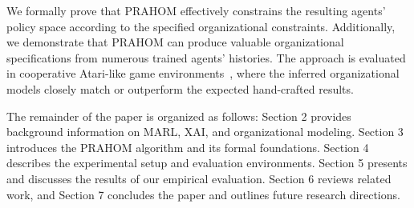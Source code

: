 \documentclass{ecai}
\newtheorem{theorem}{Theorem}
\newcounter{proof}
\renewcommand{\theproof}{\arabic{proof}}
\renewenvironment{proof}[1][]{
    \refstepcounter{proof}
    \noindent \raggedright \textit{\textbf{Proof. \theproof}}

    \setlength{\leftskip}{1em}

}
{

\
\setlength{\leftskip}{0pt}
}
\begin{document}
We formally prove that PRAHOM effectively constrains the resulting agents' policy space according to the specified organizational constraints. Additionally, we demonstrate that PRAHOM can produce valuable organizational specifications from numerous trained agents' histories. The approach is evaluated in cooperative Atari-like game environments~\citep{perolat2017pool}, where the inferred organizational models closely match or outperform the expected hand-crafted results.

The remainder of the paper is organized as follows: Section 2 provides background information on MARL, XAI, and organizational modeling. Section 3 introduces the PRAHOM algorithm and its formal foundations. Section 4 describes the experimental setup and evaluation environments. Section 5 presents and discusses the results of our empirical evaluation. Section 6 reviews related work, and Section 7 concludes the paper and outlines future research directions.






\end{document}

